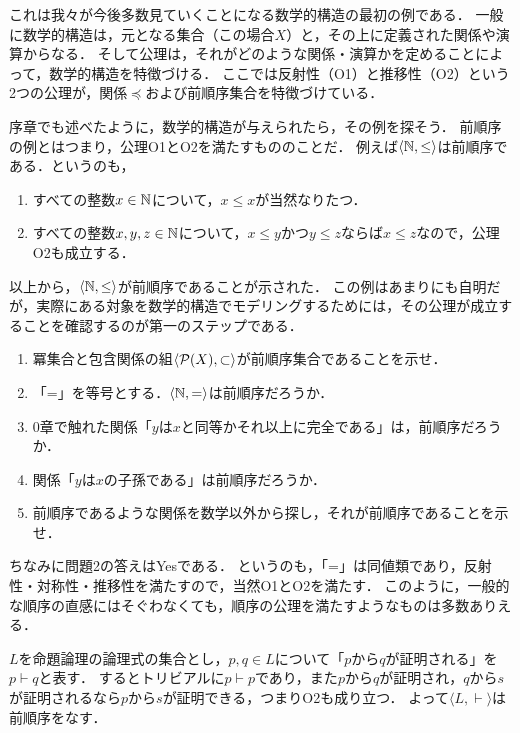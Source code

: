 \documentclass[dvipdfmx,11pt,a4paper]{jsarticle}
\begin{document}
これは我々が今後多数見ていくことになる数学的構造の最初の例である．
一般に数学的構造は，元となる集合（この場合$X$）と，その上に定義された関係や演算からなる．
そして公理は，それがどのような関係・演算かを定めることによって，数学的構造を特徴づける．
ここでは反射性（O1）と推移性（O2）という2つの公理が，関係$\preceq$および前順序集合を特徴づけている．

序章でも述べたように，数学的構造が与えられたら，その例を探そう．
前順序の例とはつまり，公理O1とO2を満たすもののことだ．
例えば$\langle \mathbb{N}, \leq \rangle$は前順序である．というのも，
\begin{enumerate}
 \item すべての整数$x \in \mathbb{N}$について，$x \leq x$が当然なりたつ．
 \item すべての整数$x, y, z \in \mathbb{N}$について，$x \leq y$かつ$y \leq z$ならば$x \leq z$なので，公理O2も成立する．
\end{enumerate}
以上から，$\langle \mathbb{N}, \leq \rangle$が前順序であることが示された．
この例はあまりにも自明だが，実際にある対象を数学的構造でモデリングするためには，その公理が成立することを確認するのが第一のステップである．

\begin{exercise}
\begin{enumerate}
 \item 冪集合と包含関係の組$\langle \mathcal{P}(X), \subset \rangle$が前順序集合であることを示せ． 
 \item 「=」を等号とする．$\langle \mathbb{N}, = \rangle$は前順序だろうか．
 \item 0章で触れた関係「$y$は$x$と同等かそれ以上に完全である」は，前順序だろうか．
 \item 関係「$y$は$x$の子孫である」は前順序だろうか．
 \item 前順序であるような関係を数学以外から探し，それが前順序であることを示せ．
\end{enumerate}
\end{exercise}

ちなみに問題2の答えはYesである．
というのも，「=」は同値類であり，反射性・対称性・推移性を満たすので，当然O1とO2を満たす．
このように，一般的な順序の直感にはそぐわなくても，順序の公理を満たすようなものは多数ありえる．

\begin{example} \label{logic}
 $L$を命題論理の論理式の集合とし，$p, q \in L$について「$p$から$q$が証明される」を$p \vdash q$と表す．
 するとトリビアルに$p \vdash p$であり，また$p$から$q$が証明され，$q$から$s$が証明されるなら$p$から$s$が証明できる，つまりO2も成り立つ．
 よって$\langle L, \vdash \rangle$は前順序をなす．
\end{example}
\end{document}
